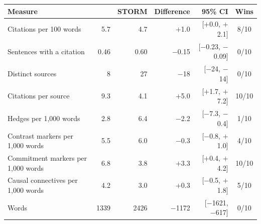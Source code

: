 \begin{tabular}{lrrrrc}
\toprule
Measure & \sys{} & STORM & Difference & 95\% CI & Wins \\
\midrule
Citations per 100 words & 5.7 & 4.7 & $+$1.0 & [$+$0.0, $+$2.1] & 8/10 \\
Sentences with a citation & 0.46 & 0.60 & $-$0.15 & [$-$0.23, $-$0.09] & 0/10 \\
Distinct sources & 8 & 27 & $-$18 & [$-$24, $-$14] & 0/10 \\
Citations per source & 9.3 & 4.1 & $+$5.0 & [$+$1.7, $+$7.2] & 10/10 \\
Hedges per 1,000 words & 2.8 & 6.4 & $-$2.2 & [$-$7.3, $-$0.4] & 1/10 \\
Contrast markers per 1,000 words & 5.5 & 6.0 & $-$0.3 & [$-$0.8, $+$1.0] & 4/10 \\
Commitment markers per 1,000 words & 6.8 & 3.8 & $+$3.3 & [$+$0.4, $+$4.2] & 10/10 \\
Causal connectives per 1,000 words & 4.2 & 3.0 & $+$0.3 & [$-$0.5, $+$1.8] & 5/10 \\
Words & 1339 & 2426 & $-$1172 & [$-$1621, $-$617] & 0/10 \\
\bottomrule
\end{tabular}
